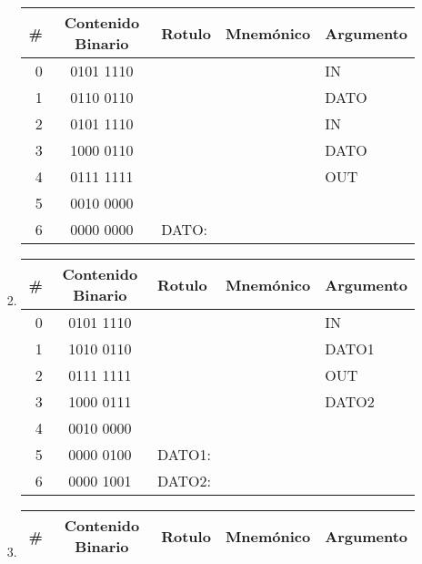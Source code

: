 \documentclass[12pt]{article}
\begin{document}
\begin{enumerate}
\begin{enumerate}
\begin{enumerate}
\begin{tabular}{r||c||l|l|l}
                    \textbf{\#} & \textbf{Contenido Binario} & \textbf{Rotulo}
                    & \textbf{Mnemónico} & \textbf{Argumento} \\
                    \hline
                    \hline

                    0 & 0101 1110 &  &  & IN\\ \hline
                    1 & 0110 0110 &  &  & DATO\\ \hline
                    2 & 0101 1110 &  &  & IN\\ \hline
                    3 & 1000 0110 &  &  & DATO\\ \hline
                    4 & 0111 1111 &  &  & OUT\\ \hline
                    5 & 0010 0000 &  &  & \\ \hline
                    6 & 0000 0000 & DATO: &  & \\ \hline

                \end{tabular}

                \item \begin{tabular}{r||c||l|l|l}

                    \textbf{\#} & \textbf{Contenido Binario} & \textbf{Rotulo}
                    & \textbf{Mnemónico} & \textbf{Argumento} \\
                    \hline
                    \hline

                    0 & 0101 1110 &  &  & IN\\ \hline
                    1 & 1010 0110 &  &  & DATO1\\ \hline
                    2 & 0111 1111 &  &  & OUT\\ \hline
                    3 & 1000 0111 &  &  & DATO2\\ \hline
                    4 & 0010 0000 &  &  & \\ \hline
                    5 & 0000 0100 & DATO1: &  & \\ \hline
                    6 & 0000 1001 & DATO2: &  & \\ \hline

                \end{tabular}

                \item \begin{tabular}{r||c||l|l|l}

                    \textbf{\#} & \textbf{Contenido Binario} & \textbf{Rotulo}
                    & \textbf{Mnemónico} & \textbf{Argumento} \\
                    \hline
                    \hline


\end{tabular}
\end{enumerate}
\end{enumerate}
\end{enumerate}
\end{document}

